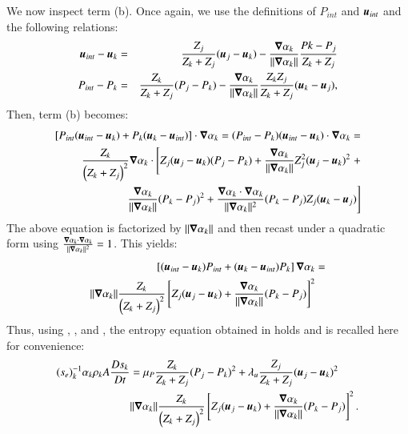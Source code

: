 \documentclass[preprint,10pt]{elsarticle}
\begin{document}
{\begin{appendices}
We now inspect term (b). Once again, we use the definitions of $P_{int}$ and $\boldsymbol u_{int}$ and the following relations:
\begin{eqnarray}
\label{eq:ent4bis}
\boldsymbol u_{int}-\boldsymbol u_k &=& \frac{Z_j}{Z_k+Z_j}(\boldsymbol u_j-\boldsymbol u_k) -  \frac{\boldsymbol\nabla \alpha_k}{\| \boldsymbol\nabla \alpha_k \|} \frac{Pk-P_j}{Z_k+Z_j} \nonumber\\
P_{int}-P_k &=& \frac{Z_k}{Z_k+Z_j} (P_j-P_k) - \frac{\boldsymbol\nabla \alpha_k}{\| \boldsymbol\nabla \alpha_k \|} \frac{Z_k Z_j}{Z_k+Z_j} (\boldsymbol u_k-\boldsymbol u_j), \nonumber 
\end{eqnarray}
Then, term (b) becomes:
\begin{eqnarray}
\label{eq:ent5}
\left[ P_{int} (\boldsymbol u_{int}-\boldsymbol u_k) + P_k (\boldsymbol u_k-\boldsymbol u_{int}) \right] \cdot \boldsymbol\nabla \alpha_k = (P_{int}-P_k)(\boldsymbol u_{int}-\boldsymbol u_k)\cdot \boldsymbol\nabla \alpha_k=  \nonumber\\ 
\frac{Z_k}{\left( Z_k+Z_j \right)^2} \boldsymbol\nabla \alpha_k \cdot \left[ Z_j (\boldsymbol u_j-\boldsymbol u_k)(P_j-P_k)+\frac{\boldsymbol\nabla \alpha_k}{\| \boldsymbol\nabla \alpha_k \|} Z_j^2 (\boldsymbol u_j-\boldsymbol u_k)^2 \right. + \nonumber \\ 
\left. \frac{\boldsymbol\nabla \alpha_k}{\| \boldsymbol\nabla \alpha_k \|}(P_k-P_j)^2 +  \frac{\boldsymbol\nabla \alpha_k \cdot \boldsymbol\nabla \alpha_k}{\| \boldsymbol\nabla \alpha_k \|^2}(P_k-P_j)Z_j (\boldsymbol u_k-\boldsymbol u_j) \right] 
\end{eqnarray}
The above equation is factorized by $\|  \boldsymbol\nabla \alpha_k \|$ and then recast under a quadratic form using $\frac{\boldsymbol\nabla \alpha_k \cdot \boldsymbol\nabla \alpha_k}{\| \boldsymbol\nabla \alpha_k \|^2} = 1$. This yields:
\begin{align}
\label{eq:ent6}
\left[ (\boldsymbol u_{int}-\boldsymbol u_k)P_{int} + (\boldsymbol u_k-\boldsymbol u_{int})P_k \right] \boldsymbol\nabla \alpha_k &=  \nonumber \\
\| \boldsymbol\nabla \alpha_k \| \frac{Z_k }{\left( Z_k+Z_j \right)^2} \left[ Z_j (\boldsymbol u_j-\boldsymbol u_k) + \frac{\boldsymbol\nabla \alpha_k}{\| \boldsymbol\nabla \alpha_k \|}(P_k-P_j)\right]^2
\end{align}
Thus, using , ,  and , the entropy equation obtained in \cite{SEM} holds and is recalled here for convenience:
\begin{align}
(s_{e})_k^{-1} \alpha_k \rho_k A \frac{Ds_k}{Dt} &= \mu_P \frac{Z_k}{Z_k+Z_j} (P_j - P_k)^2 + \lambda_u \frac{Z_j}{Z_k+Z_j} (\boldsymbol u_j -\boldsymbol u_k)^2 \nonumber
\\
& \| \boldsymbol\nabla \alpha_k \| \frac{Z_k}{\left( Z_k+Z_j \right)^2} \left[ Z_j (\boldsymbol u_j-\boldsymbol u_k)+\frac{\boldsymbol\nabla \alpha_k}{\| \boldsymbol\nabla \alpha_k \|}(P_k-P_j)\right]^2. \nonumber
\end{align}


\end{appendices}}
\end{document}
